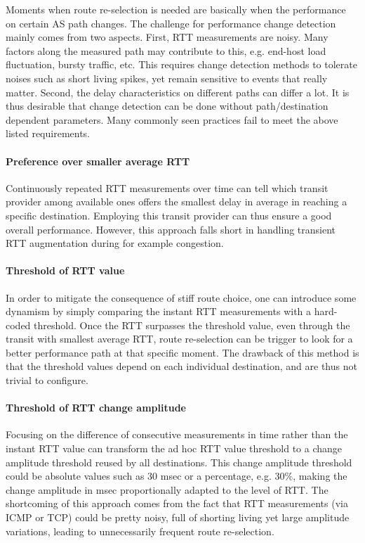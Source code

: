 Moments when route re-selection is needed are basically when the performance on certain AS path changes.
The challenge for performance change detection mainly comes from two aspects.
First, RTT measurements are noisy.
Many factors along the measured path may contribute to this, e.g. end-host load fluctuation, bursty traffic, etc.
This requires change detection methods to tolerate noises such as short living spikes, yet remain sensitive to events that really matter.
Second, the delay characteristics on different paths can differ a lot. 
It is thus desirable that change detection can be done without path/destination dependent parameters.
Many commonly seen practices fail to meet the above listed requirements. 

\paragraph{Preference over smaller average RTT} Continuously repeated RTT measurements over time can tell which transit provider among available ones offers the smallest delay in average in reaching a specific destination. Employing this transit provider can thus ensure a good overall performance. However, this approach falls short in handling transient RTT augmentation during for example congestion.

\paragraph{Threshold of RTT value} In order to mitigate the consequence of stiff route choice, one can introduce some dynamism by simply comparing the instant RTT measurements with a hard-coded threshold. Once the RTT surpasses the threshold value, even through the transit with smallest average RTT, route re-selection can be trigger to look for a better performance path at that specific moment.
The drawback of this method is that the threshold values depend on each individual destination, and are thus not trivial to configure.

\paragraph{Threshold of RTT change amplitude} Focusing on the difference of consecutive measurements in time rather than the instant RTT value can transform the ad hoc RTT value threshold to a change amplitude threshold reused by all destinations. %
This change amplitude threshold could be absolute values such as 30 msec or a percentage, e.g. $30\%$,  making the change amplitude in msec proportionally adapted to the level of RTT.
The shortcoming of this approach comes from the fact that RTT measurements (via ICMP or TCP) could be pretty noisy, full of shorting living yet large amplitude variations, leading to unnecessarily frequent route re-selection.

